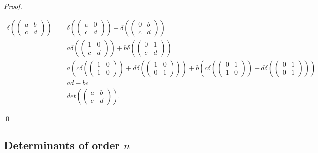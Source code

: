 \documentclass[12pt]{article}
\newenvironment{sol}
    {\emph{Proof.}
    }
    {
    \qed
    }
\begin{document}
\begin{sol}
\begin{align*}
        \delta \left( \begin{pmatrix}
    a & b \\ c & d
    \end{pmatrix} \right) &= \delta \left( \begin{pmatrix}
    a & 0 \\ c & d
    \end{pmatrix} \right) + \delta \left( \begin{pmatrix}
    0 & b \\ c & d
    \end{pmatrix} \right) \\
    &= a\delta \left( \begin{pmatrix}
    1 & 0 \\ c & d
    \end{pmatrix} \right) + b\delta \left( \begin{pmatrix}
    0 & 1 \\ c & d
    \end{pmatrix} \right) \\
    &= a \left( c\delta \left( \begin{pmatrix}
    1 & 0 \\ 1 & 0
    \end{pmatrix} \right) + d\delta \left( \begin{pmatrix}
    1 & 0 \\ 0 & 1
    \end{pmatrix} \right) \right) + b\left( c\delta \left( \begin{pmatrix}
    0 & 1 \\ 1 & 0
    \end{pmatrix} \right) + d\delta \left( \begin{pmatrix}
    0 & 1 \\ 0 & 1
    \end{pmatrix} \right) \right) \\
    &= ad - bc \\
    &= det\left( \begin{pmatrix}
    a & b \\ c & d
    \end{pmatrix} \right).
    \end{align*}
\end{sol}

\subsection{Determinants of order $n$}
\end{document}
